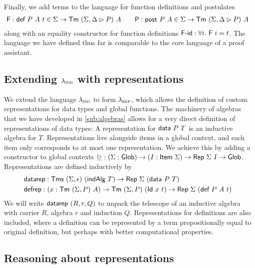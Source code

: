 Finally, we add terms to the language for function definitions and postulates
\begin{align*}
	\textsf{F} : \textsf{def}\ P\ A\ t \in \Sigma \to \textsf{Tm}\ (\Sigma, \Delta \rhd P)\ A \qquad \textsf{P} : \textsf{post}\ P\ A \in \Sigma \to \textsf{Tm}\ (\Sigma, \Delta \rhd P)\ A
\end{align*}
along with an equality constructor for function definitions $\textsf{F-id} : \forall i.\ \textsf{F}\ i = t$.
The language we have defined thus far is comparable to the core language of a
proof assistant.

\subsection{Extending $\lambda_{\textsc{ind}}$ with representations} \label{sub:lambdarep}

We extend the language $\lambda_{\textsc{ind}}$ to form $\lambda_{\textsc{rep}}$, which allows the
definition of custom representations for data types and global functions. The
machinery of algebras that we have developed in \cref{sub:algebras} allows for a
very direct definition of representations of data types: A representation for
$\textsf{data}\ P\ T$ is an inductive algebra for $T$.
Representations live alongside items in a global context, and each item only corresponds
to at most one representation. We achieve this by adding a constructor to global contexts
$\unrhd : (\Sigma : \textsf{Glob}) \to (I : \textsf{Item}\ \Sigma) \to \textsf{Rep}\ \Sigma\ I \to \textsf{Glob}$.
Representations are defined inductively by
\begin{align*}
& \textsf{datarep} : \textsf{Tms}\ (\Sigma, \epsilon)\ (\textsf{indAlg}\ T) \to \textsf{Rep}\ \Sigma\ (\textsf{data}\ P\ T) \\
& \textsf{defrep} : (x : \textsf{Tm}\ (\Sigma, P)\ A) \to \textsf{Tm}\ (\Sigma, P)\ (\textsf{Id}\ x\ t) \to \textsf{Rep}\ \Sigma\ (\textsf{def}\ P\ A\ t)
\end{align*}
We will write $\textsf{datarep}\ (R, r, Q)$ to unpack the telescope of an inductive
algebra with carrier $R$, algebra $r$ and induction
$Q$. Representations for definitions are also included, where a definition can
be represented by a term propositionally equal to original definition, but
perhaps with better computational properties.

\subsection{Reasoning about representations} \label{sub:reasoningrep}

